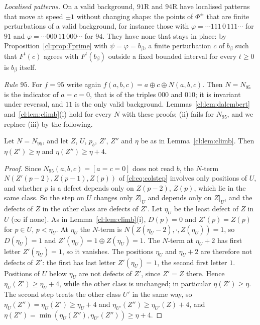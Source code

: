 \emph{Localised patterns.} On a valid background, $91$R and $94$R have localised patterns that move at speed $\pm1$ without changing shape: the points of $\Phi^\pm$ that are finite perturbations of a valid background, for instance those with $\varphi=\cdots111\,0\,111\cdots$ for $91$ and $\varphi=\cdots000\,11\,000\cdots$ for $94$. They have none that stays in place: by Proposition~\ref{cl:prop:Fprime} with $\psi=\varphi=b_\beta$, a finite perturbation $c$ of $b_\beta$ such that $F^t(c)$ agrees with $F^t(b_\beta)$ outside a fixed bounded interval for every $t\ge0$ is $b_\beta$ itself.

\emph{Rule $95$.} For $f=95$ write again $f(a,b,c)=a\oplus c\oplus N(a,b,c)$. Then $N=N_{95}$ is the indicator of $a=c=0$, that is of the triples $000$ and $010$; it is invariant under reversal, and $11$ is the only valid background. Lemmas~\ref{cl:lem:dalembert} and~\ref{cl:lem:climb}(i) hold for every $N$ with these proofs; (ii) fails for $N_{95}$, and we replace (iii) by the following.

\begin{lemma}\label{cl:lem:climb95}
Let $N=N_{95}$, and let $Z$, $U$, $p_b$, $Z'$, $Z''$ and $\eta$ be as in Lemma~\ref{cl:lem:climb}. Then $\eta(Z')\ge\eta$ and $\eta(Z'')\ge\eta+4$.
\end{lemma}

\begin{proof}
Since $N_{95}(a,b,c)=[a=c=0]$ does not read $b$, the $N$-term $N(Z'(p-2),Z(p-1),Z(p))$ of \eqref{cl:eq:colstep} involves only positions of $U$, and whether $p$ is a defect depends only on $Z(p-2)$, $Z(p)$, which lie in the same class. So the step on $U$ changes only $Z|_U$ and depends only on $Z|_U$, and the defects of $Z$ in the other class are defects of $Z'$. Let $\eta_U$ be the least defect of $Z$ in $U$ ($\infty$ if none). As in Lemma~\ref{cl:lem:climb}(i), $D(p)=0$ and $Z'(p)=Z(p)$ for $p\in U$, $p<\eta_U$. At $\eta_U$ the $N$-term is $N(Z(\eta_U-2),\cdot,Z(\eta_U))=1$, so $D(\eta_U)=1$ and $Z'(\eta_U)=1\oplus Z(\eta_U)=1$. The $N$-term at $\eta_U+2$ has first letter $Z'(\eta_U)=1$, so it vanishes. The positions $\eta_U$ and $\eta_U+2$ are therefore not defects of $Z'$: the first has last letter $Z'(\eta_U)=1$, the second first letter $1$. Positions of $U$ below $\eta_U$ are not defects of $Z'$, since $Z'=Z$ there. Hence $\eta_U(Z')\ge\eta_U+4$, while the other class is unchanged; in particular $\eta(Z')\ge\eta$. The second step treats the other class $U'$ in the same way, so $\eta_U(Z'')=\eta_U(Z')\ge\eta_U+4$ and $\eta_{U'}(Z'')\ge\eta_{U'}(Z)+4$, and $\eta(Z'')=\min(\eta_U(Z''),\eta_{U'}(Z''))\ge\eta+4$.
\end{proof}


